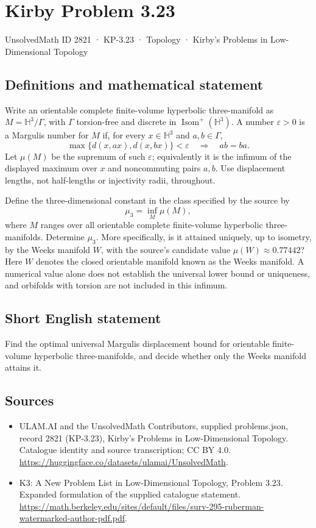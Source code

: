 \documentclass[11pt,a4paper]{article}
\begin{document}
\section*{Kirby Problem 3.23}\label{2821}
{\small UnsolvedMath ID 2821 · KP-3.23 · Topology · Kirby's Problems in Low-Dimensional Topology}
\subsection{Definitions and mathematical statement}
Write an orientable complete finite-volume hyperbolic three-manifold as
$M=\mathbb H^3/\Gamma$, with $\Gamma$ torsion-free and discrete in
$\operatorname{Isom}^+(\mathbb H^3)$. A number $\varepsilon>0$ is a
Margulis number for $M$ if, for every $x\in\mathbb H^3$ and $a,b\in\Gamma$,
\[
 \max\{d(x,ax),d(x,bx)\}<\varepsilon\quad\Longrightarrow\quad ab=ba.
\]
Let $\mu(M)$ be the supremum of such $\varepsilon$; equivalently it is
the infimum of the displayed maximum over $x$ and noncommuting pairs $a,b$.
Use displacement lengths, not half-lengths or injectivity radii, throughout.

Define the three-dimensional constant in the class specified by the source by
\[
 \mu_3=\inf_M\mu(M),
\]
where $M$ ranges over all orientable complete finite-volume hyperbolic
three-manifolds. Determine $\mu_3$. More specifically, is it attained uniquely,
up to isometry, by the Weeks manifold $W$, with the source's candidate value
$\mu(W)\approx0.77442$? Here $W$ denotes the closed orientable manifold
known as the Weeks manifold. A numerical value alone does not establish the
universal lower bound or uniqueness, and orbifolds with torsion are not included
in this infimum.
\subsection{Short English statement}
Find the optimal universal Margulis displacement bound for orientable finite-volume hyperbolic three-manifolds, and decide whether only the Weeks manifold attains it.
\subsection{Sources}
\begin{itemize}
\item[S1] ULAM.AI and the UnsolvedMath Contributors, supplied problems.json, record 2821 (KP-3.23), Kirby's Problems in Low-Dimensional Topology. Catalogue identity and source transcription; CC BY 4.0.
\url{https://huggingface.co/datasets/ulamai/UnsolvedMath}.
\item[S2] K3: A New Problem List in Low-Dimensional Topology, Problem 3.23. Expanded formulation of the supplied catalogue statement.
\url{https://math.berkeley.edu/sites/default/files/surv-295-ruberman-watermarked-author-pdf.pdf}.
\end{itemize}
\end{document}
